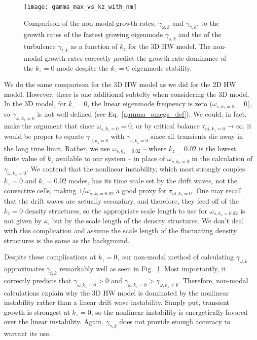 \documentclass[letter,scriptaddress,twocolumn, prl,showkeys]{revtex4}
\begin{document}
\begin{figure}
\centerline{\texttt{[image: gamma\_max\_vs\_kz\_with\_nm]}}
\caption{Comparison of the non-modal growth rates, $\gamma_{\omega,k}$ and $\gamma_{\gamma,k}$, to the growth rates of the fastest growing eigenmode $\gamma_{s,k}$ 
and the of the turbulence $\gamma_{t,k}$ as a function of $k_z$ for the 3D HW model. The non-modal growth rates correctly predict the growth rate dominance of the $k_z=0$ mode
despite the $k_z=0$ eigenmode stability.}
\label{gamma_max_vs_kz_with_nm}
\end{figure}

We do the same comparison for the 3D HW model as we did for the 2D HW model. However, there is one additional subtelty when considering the 3D model. In the 3D model, for $k_z=0$, the linear
eigenmode frequency is zero ($\omega_{s,k_z=0} = 0$), so $\gamma_{\omega,k_z=0}$ is not well defined (see Eq.~\ref{gamma_omega_def}). 
We could, in fact, make the argument that since $\omega_{s,k_z=0} = 0$, or by critical balance $\tau_{nl,k_z=0} \to \infty$, it would be proper to equate $\gamma_{\omega,k_z=0}$ with $\gamma_{s,k_z=0}$
since all transients die away in the long time limit. Rather, we use $\omega_{s,k_z=0.02}$ -- where $k_z=0.02$ is the lowest finite value of $k_z$ available to our system -- in place of
$\omega_{s,k_z=0}$ in the calculation of $\gamma_{\omega,k_z=0}$. We contend that the nonlinear instability, which most strongly couples $k_z=0$ and $k_z=0.02$ modes, has its time scale set
by the drift waves, not the convective cells, making $1/\omega_{s,k_z=0.02}$ a good proxy for $\tau_{nl,k_z=0}$. One may recall that the drift waves are actually secondary, and therefore, they feed
off of the $k_z=0$ density structures, so the appropriate scale length to use for $\omega_{s,k_z=0.02}$ is not given by $\kappa$, but by the scale length of the density structures. We don't deal
with this complication and assume the scale length of the fluctuating density structures is the same as the background.

Despite these complications at $k_z=0$, our non-modal method of calculating $\gamma_{\omega,k}$ approximates $\gamma_{t,k}$ remarkably well as seen in Fig.~\ref{gamma_max_vs_kz_with_nm}.
Most importantly, it correctly predicts that $\gamma_{\omega,k_z=0} > 0$ and $\gamma_{\omega,k_z=0} > \gamma_{\omega,k_z \ne 0}$. Therefore, non-modal calculations explain why the 3D HW model
is dominated by the nonlinear instability rather than a linear drift wave instability. Simply put, transient growth is strongest at $k_z=0$, so the nonlinear instability is energetically
favored over the linear instability. Again, $\gamma_{\gamma,k}$ does not provide enough accuracy to warrant its use.
\end{document}
